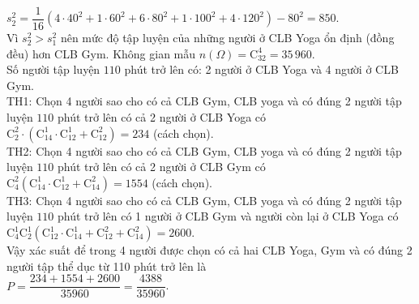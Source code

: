 \begin{ex}
{\begin{itemchoice}
			$s_{2}^2=\dfrac{1}{16}(4\cdot 40^2+1\cdot 60^2+6\cdot 80^2+1\cdot 100^2+4\cdot 120^2)-80^2=850$.\\
			Vì $s_{2}^2> s_{1}^2$ nên mức độ tập luyện của những người ở CLB Yoga ổn định (đồng đều) hơn CLB Gym.
			\itemch Không gian mẫu $n(\Omega)=\mathrm{C}_{32}^4=35\,960$.\\
			Số người tập luyện $110$ phút trở lên có: 2 người ở CLB Yoga và 4 người ở CLB Gym.\\
			TH1: Chọn 4 người sao cho có cả CLB Gym, CLB yoga và có đúng 2 người tập luyện $110$ phút trở lên có cả 2 người ở CLB Yoga có\\
			$\mathrm{C}_{2}^2\cdot (\mathrm{C}_{14}^{1} \cdot \mathrm{C}_{12}^{1}+\mathrm{C}_{12}^2)=234$ (cách chọn).\\
			TH2: Chọn 4 người sao cho có cả CLB Gym, CLB yoga và có đúng 2 người tập luyện $110$ phút trở lên có cả 2 người ở CLB Gym có\\
			$\mathrm{C}_{4}^2(\mathrm{C}_{14}^{1}\cdot \mathrm{C}_{12}^{1}+\mathrm{C}_{14}^2)=1554$ (cách chọn).\\
			TH3: Chọn 4 người sao cho có cả CLB Gym, CLB yoga và có đúng 2 người tập luyện $110$ phút trở lên có 1 người ở CLB Gym và người còn lại ở CLB Yoga có\\ $\mathrm{C}_{4}^{1}\mathrm{C}_{2}^{1}(\mathrm{C}_{12}^{1}\cdot \mathrm{C}_{14}^{1}+\mathrm{C}_{12}^2+\mathrm{C}_{14}^2)=2600$.\\
			Vậy xác suất để trong 4 người được chọn có cả hai CLB Yoga, Gym và có đúng 2 người tập thể dục từ 110 phút trở lên là\\ $P=\dfrac{234+1554+2600}{35960}=\dfrac{4388}{35960}$.
		\end{itemchoice}
	}
\end{ex}
